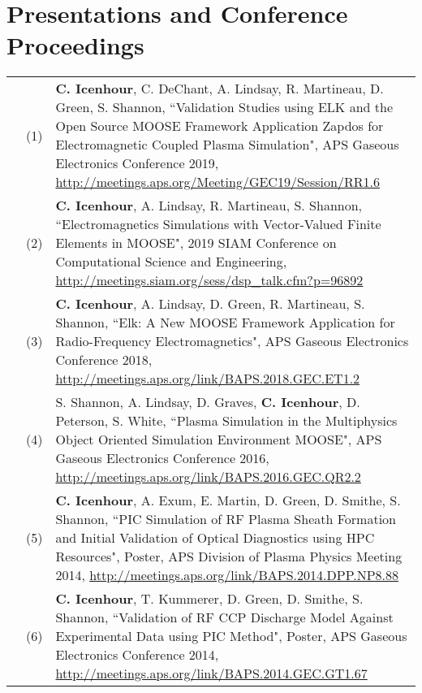 \documentclass{article}
\begin{document}
\section*{Presentations and Conference Proceedings}

	\begin{tabularx}{\textwidth}{l l X}
		\hspace{2em}
			& (1)  & \textbf{C. Icenhour}, C. DeChant, A. Lindsay, R. Martineau, D. Green, S. Shannon, ``Validation Studies using ELK and the Open Source MOOSE Framework Application Zapdos for Electromagnetic Coupled Plasma Simulation", APS Gaseous Electronics Conference 2019, \url{http://meetings.aps.org/Meeting/GEC19/Session/RR1.6} \\
			& (2)  & \textbf{C. Icenhour}, A. Lindsay, R. Martineau, S. Shannon, ``Electromagnetics Simulations with Vector-Valued Finite Elements in MOOSE", 2019 SIAM Conference on Computational Science and Engineering, \url{http://meetings.siam.org/sess/dsp_talk.cfm?p=96892} \\
			& (3)  & \textbf{C. Icenhour}, A. Lindsay, D. Green, R. Martineau, S. Shannon, ``Elk: A New MOOSE Framework Application for Radio-Frequency Electromagnetics", APS Gaseous Electronics Conference 2018, \url{http://meetings.aps.org/link/BAPS.2018.GEC.ET1.2} \\
			& (4)  &  S. Shannon, A. Lindsay, D. Graves, \textbf{C. Icenhour}, D. Peterson, S. White, ``Plasma Simulation in the Multiphysics Object Oriented Simulation Environment MOOSE", APS Gaseous Electronics Conference 2016, \newline \url{http://meetings.aps.org/link/BAPS.2016.GEC.QR2.2} \\
			& (5)  & \textbf{C. Icenhour}, A. Exum, E. Martin, D. Green, D. Smithe, S. Shannon, ``PIC Simulation of RF Plasma Sheath Formation and Initial Validation of Optical Diagnostics using HPC Resources", Poster, APS Division of Plasma Physics Meeting 2014, \url{http://meetings.aps.org/link/BAPS.2014.DPP.NP8.88} \\
			& (6)  & \textbf{C. Icenhour}, T. Kummerer, D. Green, D. Smithe, S. Shannon, ``Validation of RF CCP Discharge Model Against Experimental Data using PIC Method", Poster, APS Gaseous Electronics Conference 2014, \newline \url{http://meetings.aps.org/link/BAPS.2014.GEC.GT1.67}
	\end{tabularx}
\end{document}
